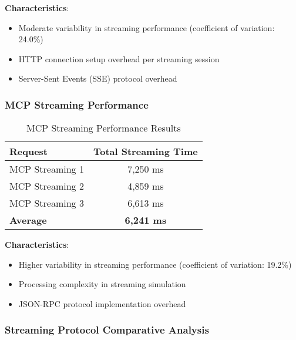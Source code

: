 \textbf{Characteristics}:
\begin{itemize}
    \item Moderate variability in streaming performance (coefficient of variation: 24.0\%)
    \item HTTP connection setup overhead per streaming session
    \item Server-Sent Events (SSE) protocol overhead
\end{itemize}

\subsubsection{MCP Streaming Performance}

\begin{table}[h]
\centering
\caption{MCP Streaming Performance Results}
\begin{tabular}{|l|c|}
\hline
\textbf{Request} & \textbf{Total Streaming Time} \\
\hline
MCP Streaming 1 & 7,250 ms \\
\hline
MCP Streaming 2 & 4,859 ms \\
\hline
MCP Streaming 3 & 6,613 ms \\
\hline
\textbf{Average} & \textbf{6,241 ms} \\
\hline
\end{tabular}
\end{table}

\textbf{Characteristics}:
\begin{itemize}
    \item Higher variability in streaming performance (coefficient of variation: 19.2\%)
    \item Processing complexity in streaming simulation
    \item JSON-RPC protocol implementation overhead
\end{itemize}

\subsubsection{Streaming Protocol Comparative Analysis}

\begin{table}[h]
\centering
\caption{Streaming Protocol Performance Comparison}
\end{table}

